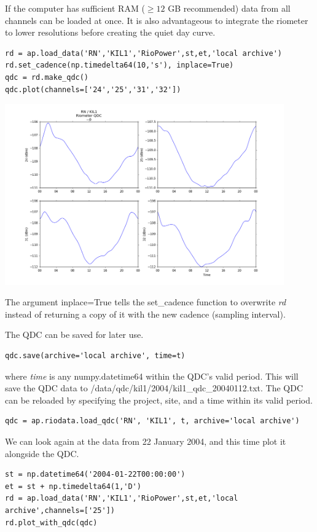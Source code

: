 \documentclass{article}
\begin{document}
If the computer has sufficient RAM ($\ge 12$ GB recommended) data from all channels can be loaded at once. It is also advantageous to integrate the riometer to lower resolutions before creating the quiet day curve.

\begin{lstlisting}[style=pythonstyle]
rd = ap.load_data('RN','KIL1','RioPower',st,et,'local archive')
rd.set_cadence(np.timedelta64(10,'s'), inplace=True)
qdc = rd.make_qdc()
qdc.plot(channels=['24','25','31','32'])
\end{lstlisting}

\includegraphics[width=12cm]{images/figure_3.png}


\noindent The argument inplace=True tells the set\_cadence function to overwrite {\it rd} instead of returning a copy of it with the new cadence (sampling interval).

The QDC can be saved for later use.

\begin{lstlisting}[style=pythonstyle]
qdc.save(archive='local archive', time=t)
\end{lstlisting}

\noindent where {\it time} is any numpy.datetime64 within the QDC's valid period. This will save the QDC data to /data/qdc/kil1/2004/kil1\_qdc\_20040112.txt.
The QDC can be reloaded by specifying the project, site, and a time within its valid period.
\begin{lstlisting}[style=pythonstyle]
qdc = ap.riodata.load_qdc('RN', 'KIL1', t, archive='local archive')
\end{lstlisting}

We can look again at the data from 22 January 2004, and this time plot it alongside the QDC.

\begin{lstlisting}[style=pythonstyle]
st = np.datetime64('2004-01-22T00:00:00')
et = st + np.timedelta64(1,'D')
rd = ap.load_data('RN','KIL1','RioPower',st,et,'local archive',channels=['25'])
rd.plot_with_qdc(qdc)
\end{lstlisting}
\end{document}
